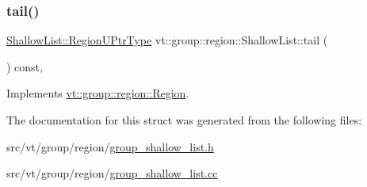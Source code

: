 \subsubsection{\texorpdfstring{tail()}{tail()}}
{\footnotesize\ttfamily \hyperlink{structvt_1_1group_1_1region_1_1_region_ae5f42cf159116a3cf8bd65423eb01037}{Shallow\+List\+::\+Region\+U\+Ptr\+Type} vt\+::group\+::region\+::\+Shallow\+List\+::tail (\begin{DoxyParamCaption}{ }\end{DoxyParamCaption}) const\hspace{0.3cm}{\ttfamily [override]}, {\ttfamily [virtual]}}



Implements \hyperlink{structvt_1_1group_1_1region_1_1_region_a7d5bc5711c1b7954e27defa4dc94af40}{vt\+::group\+::region\+::\+Region}.



The documentation for this struct was generated from the following files\+:\begin{DoxyCompactItemize}
\item 
src/vt/group/region/\hyperlink{group__shallow__list_8h}{group\+\_\+shallow\+\_\+list.\+h}\item 
src/vt/group/region/\hyperlink{group__shallow__list_8cc}{group\+\_\+shallow\+\_\+list.\+cc}\end{DoxyCompactItemize}
